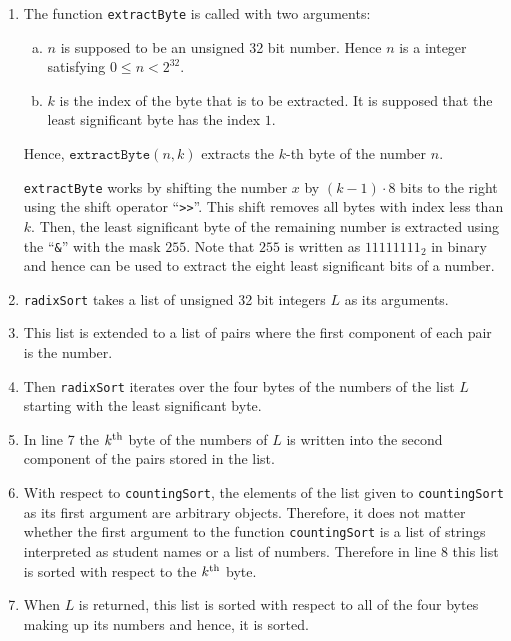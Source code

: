 \begin{enumerate}
\item The function \texttt{extractByte} is called with two arguments:
      \begin{enumerate}[(a)]
      \item $n$ is supposed to be an unsigned 32 bit number.  Hence $n$ is a integer satisfying $0 \leq n < 2^{32}$.
      \item $k$ is the index of the byte that is to be extracted.  It is supposed that the least significant
            byte has the index $1$.
      \end{enumerate}
      Hence, $\texttt{extractByte}(n, k)$ extracts the $k$-th byte of the number $n$.

      \texttt{extractByte} works by shifting the number $x$ by $(k-1) \cdot 8$ bits to the right using the shift
      operator ``\texttt{>>}''.  This shift removes all bytes with index less than $k$. Then, the least significant
      byte of the remaining number is extracted using the   ``\texttt{\&}'' with the
      mask $255$.  Note that $255$ is written as $11111111_2$ in binary and hence can be used to extract the
      eight least significant bits of a number. 
\item \texttt{radixSort} takes a list of unsigned 32 bit integers $L$ as its arguments.
\item This list is extended to a list of pairs where the first component of each pair is the number.      
\item Then \texttt{radixSort} iterates over the four bytes of the numbers of the list $L$ starting with the
      least significant byte.
\item In line 7 the $k^\mathrm{\scriptsize th}$ byte of the numbers of $L$ is written into the second component
      of the pairs stored in the list.      
\item With respect to \texttt{countingSort},  the elements of the list given to \texttt{countingSort} as its
      first argument are 
      arbitrary objects.  Therefore, it does not matter whether the first argument to the function
      \texttt{countingSort} is a list of strings interpreted as student names or a list of numbers.
      Therefore in line 8 this list
      is sorted with respect to the $k^\mathrm{\scriptsize th}$ byte. 
\item When $L$ is returned, this list is sorted with respect to all of the four bytes making up its numbers and
      hence, it is sorted.
\end{enumerate}

